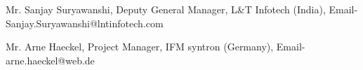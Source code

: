 \vspace{\acvSectionTopSkip}
\vspace{\acvSectionTopSkip}
\begin{cvparagraph}
      \begin{cvitems} %
        \item {Mr. Sanjay Suryawanshi, Deputy General Manager, L&T Infotech (India), Email- Sanjay.Suryawanshi@lntinfotech.com}
        \item {Mr. Arne Haeckel, Project Manager, IFM syntron (Germany), Email- arne.haeckel@web.de}
      \end{cvitems}
\end{cvparagraph}


